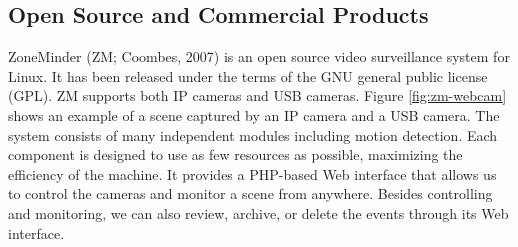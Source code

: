 \subsection{Open Source and Commercial Products}

ZoneMinder (ZM; Coombes, 2007)\nocite{zoneminder} is an open source
video surveillance system for Linux. It has been released under the
terms of the GNU general public license (GPL). ZM supports both IP
cameras and USB cameras. Figure \ref{fig:zm-webcam} shows an example
of a scene captured by an IP camera and a USB camera. The system
consists of many independent modules including motion detection.  Each
component is designed to use as few resources as possible, maximizing
the efficiency of the machine. It provides a PHP-based Web interface
that allows us to control the cameras and monitor a scene from
anywhere. Besides controlling and monitoring, we can also review,
archive, or delete the events through its Web interface.

